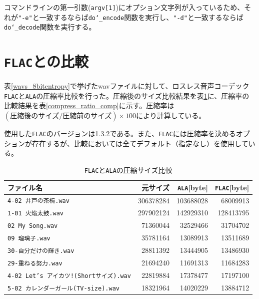 \documentclass[uplatex,dvipdfmx,b5j,10pt]{jsbook}
\theoremstyle{definition}
\begin{document}
コマンドラインの第一引数(\texttt{argv[1]})にオプション文字列が入っているため、それが\texttt{"-e"}と一致するならば\texttt{do\char`_encode}関数を実行し、\texttt{"-d"}と一致するならば\texttt{do\char`_decode}関数を実行する。

\section{\texttt{FLAC}との比較} \label{flac_comparison}

表\ref{wavs_8bitentropy}で挙げたwavファイルに対して、ロスレス音声コーデック\texttt{FLAC}と\texttt{ALA}の圧縮率比較を行った。圧縮後のサイズ比較結果を表\ref{compress_size_comp}に、圧縮率の比較結果を表\ref{compress_ratio_comp}に示す。圧縮率は$(圧縮後のサイズ/圧縮前のサイズ) \times 100$により計算している。

使用した\texttt{FLAC}のバージョンは1.3.2である。また、\texttt{FLAC}には圧縮率を決めるオプションが存在するが、比較においては全てデフォルト（指定なし）を使用している。
\begin{table}[htbp]
  \begin{center}
    \caption{\texttt{FLAC}と\texttt{ALA}の圧縮サイズ比較} \label{compress_size_comp}
    \begin{tabular}{|l|r|r|r|}
      \hline
      ファイル名 & 元サイズ & \texttt{ALA}[byte] & \texttt{FLAC}[byte] \\ \hline
      \texttt{4-02 井戸の茶椀.wav}                    & 306378284 & 103688028 &  68009913   \\ \hline
      \texttt{1-01 火焔太鼓.wav}                      & 297902124 & 142929310 & 128413795   \\ \hline
      \texttt{02 My Song.wav}                         &  71360044 &  32529466 &  31704702   \\ \hline
      \texttt{09 瑠璃子.wav}                          &  35781164 &  13089913 &  13511689   \\ \hline
      \texttt{30-自分だけの輝き.wav}                  &  28811392 &  13444905 &  13486930   \\ \hline
      \texttt{29-重ねる努力.wav}                      &  21694240 &  11691313 &  11684283   \\ \hline
      \texttt{4-02 Let's アイカツ!(Shortサイズ).wav}  &  22819884 &  17378477 &  17197100   \\ \hline
      \texttt{5-02 カレンダーガール(TV-size).wav}     &  18321964 &  14020229 &  13884712   \\ \hline
    \end{tabular}
  \end{center}
\end{table}
\end{document}
